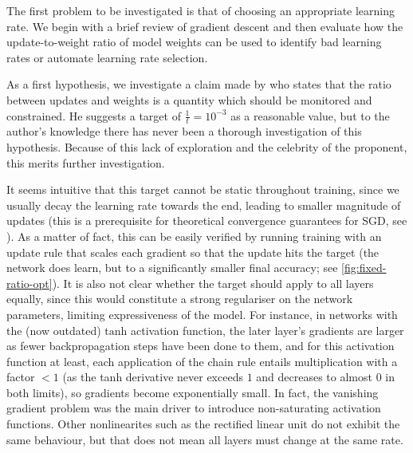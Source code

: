 The first problem to be investigated is that of choosing an appropriate learning
rate. We begin with a brief review of gradient descent and then evaluate how
the update-to-weight ratio of model weights can be used to identify bad learning
rates or automate learning rate selection.

As a first hypothesis, we investigate a claim made by \citet{karpathycs231n} who
states that the ratio between updates and weights is a quantity which should be
monitored and constrained. He suggests a target of $\frac{1}{t} = 10^{-3}$ as a
reasonable value, but to the author's knowledge there has never been a thorough
investigation of this hypothesis. Because of this lack of exploration and the
celebrity of the proponent, this merits further investigation.

It seems intuitive that this target cannot be static throughout training, since
we usually decay the learning rate towards the end, leading to smaller magnitude
of updates (this is a prerequisite for theoretical convergence guarantees for
SGD, see \citet[p. 20]{saad1998online}). As a matter of fact, this can be easily
verified by running training with an update rule that scales each gradient so
that the update hits the target (the network does learn, but to a significantly
smaller final accuracy; see \cref{fig:fixed-ratio-opt}). It is also not clear
whether the target should apply to all layers equally, since this would
constitute a strong regulariser on the network parameters, limiting
expressiveness of the model. For instance, in networks with the (now outdated)
$\text{tanh}$ activation function, the later layer's gradients are larger as
fewer backpropagation steps have been done to them, and for this activation
function at least, each application of the chain rule entails multiplication
with a factor $< 1$ (as the tanh derivative never exceeds $1$ and decreases to
almost $0$ in both limits), so gradients become exponentially small. In fact,
the vanishing gradient problem was the main driver to introduce non-saturating
activation functions.  Other nonlinearites such as the rectified linear unit do
not exhibit the same behaviour, but that does not mean all layers must change at
the same rate.


